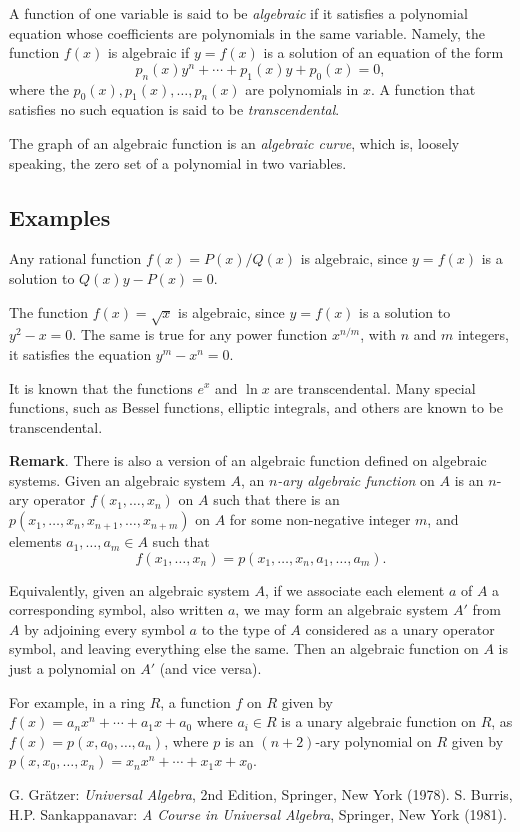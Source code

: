 \documentclass[12pt]{article}
\begin{document}
%
%
%
A function of one variable is said to be \emph{algebraic} if it satisfies a polynomial equation whose coefficients are polynomials in the same variable.
Namely, the function $f(x)$ is algebraic if $y=f(x)$ is a solution of an equation of the form
\[
  p_n(x) y^n + \cdots + p_1(x) y + p_0(x) = 0,
\]
where the $p_0(x), p_1(x), \ldots, p_n(x)$ are polynomials in $x$. A function that satisfies no such equation is said to be \emph{transcendental}.

The graph of an algebraic function is an \emph{algebraic curve}, which is, loosely speaking, the zero set of a polynomial in two variables.

\subsection*{Examples}
Any rational function $f(x) = P(x)/Q(x)$ is algebraic, since $y=f(x)$ is a solution to $Q(x)y - P(x) = 0$. 

The function $f(x)=\sqrt{x}$ is algebraic, since $y=f(x)$ is a
solution to $y^2 - x = 0$. The same is true for any power function
$x^{n/m}$, with $n$ and $m$ integers, it satisfies the equation $y^m-x^n=0$.

It is known that the functions $e^x$ and $\ln x$ are transcendental. Many special functions, such as Bessel functions, elliptic integrals, and others are known to be transcendental.

\textbf{Remark}.  There is also a version of an algebraic function defined on algebraic systems.  Given an algebraic system $A$, an \emph{$n$-ary algebraic function} on $A$ is an $n$-ary operator $f(x_1,\ldots,x_n)$ on $A$ such that there is an  $p(x_1,\ldots,x_n,x_{n+1},\ldots, x_{n+m})$ on $A$ for some non-negative integer $m$, and elements $a_1,\ldots, a_m\in A$ such that $$f(x_1,\ldots,x_n) = p(x_1,\ldots,x_n,a_1,\ldots, a_m).$$

Equivalently, given an algebraic system $A$, if we associate each element $a$ of $A$ a corresponding symbol, also written $a$, we may form an algebraic system $A'$ from $A$ by adjoining every symbol $a$ to the type of $A$ considered as a unary operator symbol, and leaving everything else the same.  Then an algebraic function on $A$ is just a polynomial on $A'$ (and vice versa).

For example, in a ring $R$, a function $f$ on $R$ given by $f(x)=a_nx^n+\cdots + a_1x+a_0$ where $a_i\in R$ is a unary algebraic function on $R$, as $f(x)=p(x,a_0,\ldots,a_n)$, where $p$ is an $(n+2)$-ary polynomial on $R$ given by $p(x,x_0,\ldots,x_n)=x_nx^n+\cdots + x_1x+x_0$.

\begin{thebibliography}{9}
 G. Gr\"{a}tzer: {\em Universal Algebra}, 2nd Edition, Springer, New York (1978).
 S. Burris, H.P. Sankappanavar: {\em A Course in Universal Algebra}, Springer, New York (1981).
\end{thebibliography}
\end{document}
